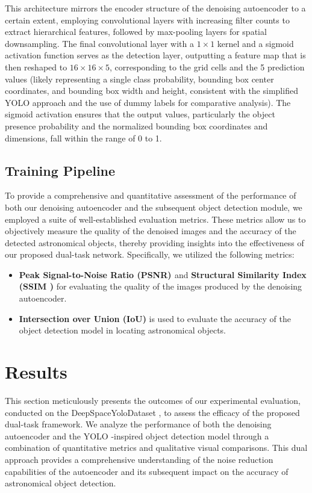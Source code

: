 \documentclass[12pt, conference]{IEEEtran}
\begin{document}
This architecture mirrors the encoder structure of the denoising autoencoder to a certain extent, employing convolutional layers with increasing filter counts to extract hierarchical features, followed by max-pooling layers for spatial downsampling. The final convolutional layer with a $1\times1$ kernel and a sigmoid activation function serves as the detection layer, outputting a feature map that is then reshaped to $16 \times 16 \times 5$, corresponding to the grid cells and the 5 prediction values (likely representing a single class probability, bounding box center coordinates, and bounding box width and height, consistent with the simplified YOLO \cite{redmon2016you} approach and the use of dummy labels for comparative analysis). The sigmoid activation ensures that the output values, particularly the object presence probability and the normalized bounding box coordinates and dimensions, fall within the range of 0 to 1. 

\subsection{Training Pipeline}
To provide a comprehensive and quantitative assessment of the performance of both our denoising autoencoder and the subsequent object detection module, we employed a suite of well-established evaluation metrics. These metrics allow us to objectively measure the quality of the denoised images and the accuracy of the detected astronomical objects, thereby providing insights into the effectiveness of our proposed dual-task network. Specifically, we utilized the following metrics:

\begin{itemize}
    \item \textbf{Peak Signal-to-Noise Ratio (PSNR) \cite{hore2010image}} and \textbf{Structural Similarity Index (SSIM \cite{wang2004image})} for evaluating the quality of the images produced by the denoising autoencoder.
    \item \textbf{Intersection over Union (IoU)} is used to evaluate the accuracy of the object detection model in locating astronomical objects.
\end{itemize}

\section{Results}
This section meticulously presents the outcomes of our experimental evaluation, conducted on the DeepSpaceYoloDataset \cite{deepspaceyolo}, to assess the efficacy of the proposed dual-task framework. We analyze the performance of both the denoising autoencoder and the YOLO \cite{redmon2016you}-inspired object detection model through a combination of quantitative metrics and qualitative visual comparisons. This dual approach provides a comprehensive understanding of the noise reduction capabilities of the autoencoder and its subsequent impact on the accuracy of astronomical object detection.
\end{document}
